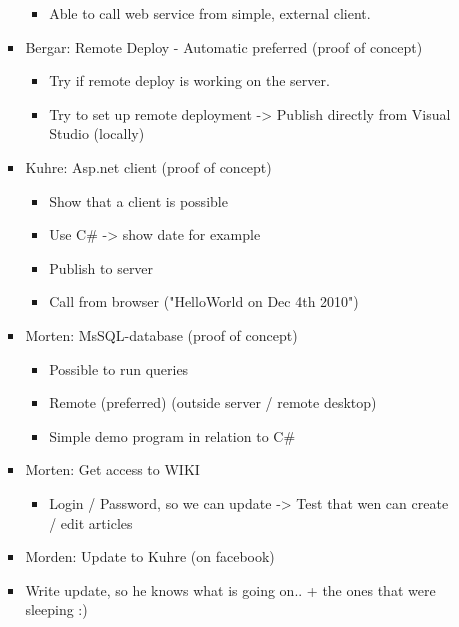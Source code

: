 \documentclass[11pt]{article}
\begin{document}
\begin{landscape}
\begin{multicols}{2}
\begin{itemize}
\begin{itemize}
\begin{itemize}
\begin{itemize}
\item Able to call web service from simple, external client.
\end{itemize}
\item Bergar: Remote Deploy - Automatic preferred (proof of concept)
\begin{itemize}
\item Try if remote deploy is working on the server.
\item Try to set up remote deployment -> Publish directly from Visual Studio (locally)
\end{itemize}
\item Kuhre: Asp.net client (proof of concept)
\begin{itemize}
\item Show that a client is possible
\item Use C\# -> show date for example
\item Publish to server
\item Call from browser ("HelloWorld on Dec 4th 2010")
\end{itemize}
\item Morten: MsSQL-database (proof of concept)
\begin{itemize}
\item Possible to run queries
\item Remote (preferred) (outside server / remote desktop)
\item Simple demo program in relation to C\#
\end{itemize}
\item Morten: Get access to WIKI
\begin{itemize}
\item Login / Password, so we can update -> Test that wen can create / edit articles
\end{itemize}
\item Morden: Update to Kuhre (on facebook)
\end{itemize}
\begin{itemize}
\item Write update, so he knows what is going on.. + the ones that were sleeping :)
\end{itemize}
\end{itemize}
\end{itemize}


\end{multicols}
\end{landscape}
\end{document}
